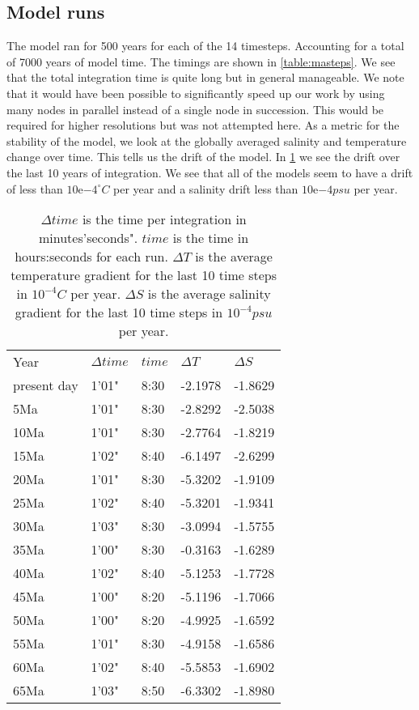 \subsection{Model runs}
The model ran for 500 years for each of the 14 timesteps. Accounting for a total of 7000 years of model time. The timings are shown in \cref{table:masteps}. We see that the total integration time is quite long but in general manageable. We note that it would have been possible to significantly speed up our work by using many nodes in parallel instead of a single node in succession. This would be required for higher resolutions but was not attempted here.
As a metric for the stability of the model, we look at the globally averaged salinity and temperature change over time. This tells us the drift of the model. In \cref{table:mastepstable} we see the drift over the last 10 years of integration. We see that all of the models seem to have a drift of less than $10\mathrm{e}{-4}^{\circ}C$ per year and a salinity drift less than $10\mathrm{e}{-4} psu$ per year.

\begin{table}[H]
	\centering
	\begin{tabular}{lllll}
Year & $\Delta time$ & $time$ & $\Delta T$& $\Delta S$\\
present day & 1'01" & 8:30& -2.1978& -1.8629\\
5Ma& 1'01" & 8:30& -2.8292& -2.5038 \\
10Ma & 1'01" & 8:30& -2.7764& -1.8219\\
15Ma & 1'02" & 8:40& -6.1497& -2.6299\\
20Ma & 1'01" & 8:30&  -5.3202& -1.9109\\
25Ma & 1'02" & 8:40& -5.3201& -1.9341\\
30Ma & 1'03" & 8:30& -3.0994& -1.5755\\
35Ma & 1'00" & 8:30& -0.3163&-1.6289\\
40Ma & 1'02" & 8:40& -5.1253& -1.7728\\
45Ma & 1'00" & 8:20& -5.1196& -1.7066\\
50Ma & 1'00" & 8:20& -4.9925& -1.6592\\
55Ma & 1'01" & 8:30& -4.9158& -1.6586\\
60Ma & 1'02" & 8:40& -5.5853& -1.6902\\
65Ma & 1'03" & 8:50& -6.3302& -1.8980\\
	\end{tabular}

\caption{$\Delta time$ is the time per integration in minutes'seconds". $time$ is the time in hours:seconds for each run. $\Delta T$ is the average temperature gradient for the last 10 time steps in $10^{-4} C$ per year. $\Delta S$ is the average salinity gradient for the last 10 time steps in $10^{-4} psu$ per year.}
\label{table:mastepstable}
\end{table}


